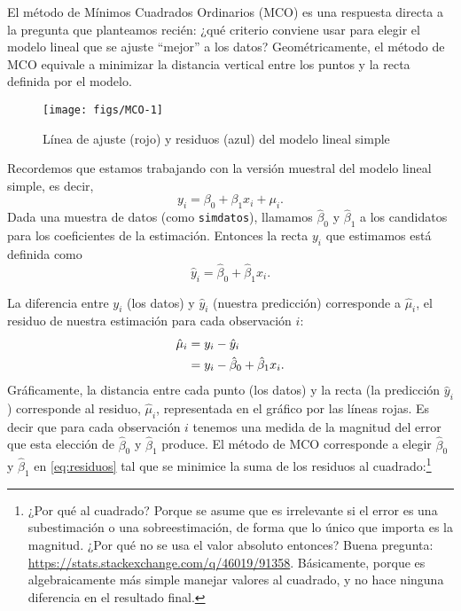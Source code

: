 \documentclass{report}\usepackage[]{graphicx}\usepackage[]{color}
\newenvironment{knitrout}{}{} %
\begin{document}
El método de Mínimos Cuadrados Ordinarios (MCO) es una respuesta directa a la pregunta que planteamos recién: ¿qué criterio conviene usar para elegir el modelo lineal que se ajuste ``mejor'' a los datos?
Geométricamente, el método de MCO equivale a minimizar la distancia vertical entre los puntos y la recta definida por el modelo.

\begin{knitrout}
\color{fgcolor}\begin{figure}

{\centering \texttt{[image: figs/MCO-1]} 

}

\caption[Línea de ajuste (rojo) y residuos (azul) del modelo lineal simple]{Línea de ajuste (rojo) y residuos (azul) del modelo lineal simple}\label{fig:MCO}
\end{figure}


\end{knitrout}

Recordemos que estamos trabajando con la versión muestral del modelo lineal simple, es decir,
\begin{equation*}
y_i = \beta_0 + \beta_1 x_i + \mu_i.
\end{equation*}
Dada una muestra de datos (como \verb|simdatos|), llamamos $\hat\beta_0$ y $\hat\beta_1$ a los candidatos para los coeficientes de la estimación. Entonces la recta $y_i$ que estimamos está definida como
\begin{equation}
\hat y_i = \hat\beta_0 + \hat\beta_1 x_i.
\end{equation}

La diferencia entre $y_i$ (los datos) y $\hat y_i$ (nuestra predicción) corresponde a $\hat\mu_i$, el residuo de nuestra estimación para cada observación $i$: 
\begin{align}
\hat \mu_i &= y_i - \hat y_i \notag \\
           &= y_i - \hat\beta_0 + \hat\beta_1 x_i.
\label{eq:residuos}
\end{align}
Gráficamente, la distancia entre cada punto (los datos) y la recta (la predicción $\hat y_i$)  corresponde al residuo, $\hat\mu_i$, representada en el gráfico por las líneas rojas. 
Es decir que para cada observación $i$ tenemos una medida de la magnitud del error que esta elección de $\hat\beta_0$ y $\hat\beta_1$ produce.
El método de MCO corresponde a elegir $\hat\beta_0$ y $\hat\beta_1$ en \eqref{eq:residuos} tal que se minimice la suma de los residuos al cuadrado:\footnote{¿Por qué al cuadrado? Porque se asume que es irrelevante si el error es una subestimación o una sobreestimación, de forma que lo único que importa es la magnitud. ¿Por qué no se usa el valor absoluto entonces? Buena pregunta: \url{https://stats.stackexchange.com/q/46019/91358}. Básicamente, porque es algebraicamente más simple manejar valores al cuadrado, y no hace ninguna diferencia en el resultado final.}
\end{document}
